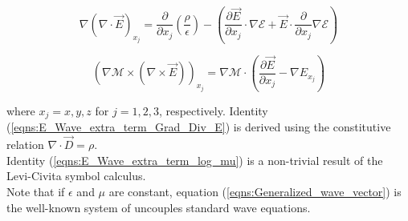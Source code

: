 \documentclass[twocolumn,secnumarabic,amssymb, nobibnotes, aps, prd]{revtex4-1}
\begin{document}
\begin{equation}
\nabla \left( \nabla \cdot \overrightarrow{E} \right)_{x_j} = \frac{\partial}{\partial x_j}\left( \frac{\rho}{\epsilon}\right) - \left(\frac{\partial \overrightarrow{E}}{\partial x_j} \cdot \nabla \mathcal{E} + \overrightarrow{E} \cdot \frac{\partial}{\partial x_j} \nabla \mathcal{E} \right)
\label{eqns:E_Wave_extra_term_Grad_Div_E} 
\end{equation}

\begin{equation}
\left(\nabla \mathcal{M} \times \left(\nabla \times \overrightarrow{E} \right) \right)_{x_j} = 
\nabla \mathcal{M} \cdot \left( \frac{\partial \overrightarrow{E}}{\partial x_j}- \nabla E_{x_j} \right)
\label{eqns:E_Wave_extra_term_log_mu}
\end{equation}

where $x_j = x,y,z$ for $j=1,2,3$, respectively. Identity (\ref{eqns:E_Wave_extra_term_Grad_Div_E}) is derived using the constitutive relation
$\nabla \cdot \overrightarrow{D} = \rho$. \\
Identity (\ref{eqns:E_Wave_extra_term_log_mu}) is a non-trivial result of the Levi-Civita symbol calculus.\\
Note that if $\epsilon$ and $\mu$ are constant, equation (\ref{eqns:Generalized_wave_vector}) is the well-known system of uncouples standard wave equations.
\end{document}
